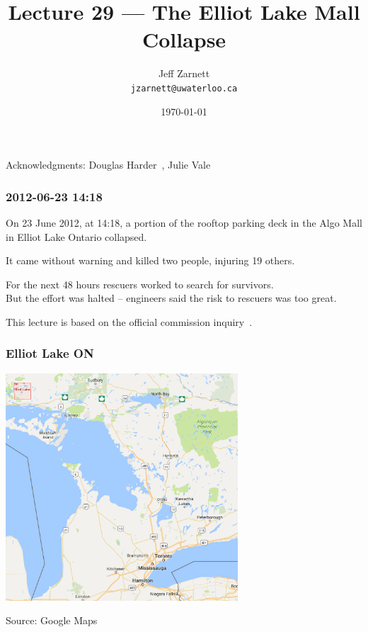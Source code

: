 

\title{Lecture 29 --- The Elliot Lake Mall Collapse }

\author{Jeff Zarnett \\ \small \texttt{jzarnett@uwaterloo.ca}}
\date{\today}




\begin{frame}
  \titlepage

\begin{center}
  \small{Acknowledgments: Douglas Harder~\cite{dwh}, Julie Vale~\cite{jv}}
  \end{center}
\end{frame}



\begin{frame}
\frametitle{2012-06-23 14:18}

On 23 June 2012, at 14:18, a portion of the rooftop parking deck in the Algo Mall in Elliot Lake Ontario collapsed.

It came without warning and killed two people, injuring 19 others.

For the next 48 hours rescuers worked to search for survivors.\\
\quad But the effort was halted -- engineers said the risk to rescuers was too great.

This lecture is based on the official commission inquiry~\cite{eli}. 

\end{frame}



\begin{frame}
\frametitle{Elliot Lake ON}

\begin{center}
	\includegraphics[width=0.65\textwidth]{images/Elliot-Lake-Map.png}
\end{center}
Source: Google Maps

\end{frame}



